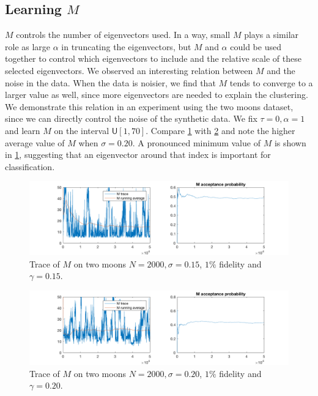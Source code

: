 \documentclass{siamart1116}
\begin{document}
    \subsection{Learning $M$}
        $M$ controls the number of eigenvectors used. In a way, small $M$ plays a similar role as large $\alpha$ in truncating the eigenvectors, but $M$ and $\alpha$ could be used together to control which eigenvectors to include and the relative scale of these selected eigenvectors. We observed an interesting relation between $M$ and the noise in the data. When the data is noisier, we find that $M$ tends to converge to a larger value as well, since more eigenvectors are needed to explain the clustering. We demonstrate this relation in an experiment using the two moons dataset, since we can directly control the noise of the synthetic data. We fix $\tau=0, \alpha = 1$ and learn $M$ on the interval $\mathsf{U}[1,70]$. Compare \cref{taM_M_moons_1} with \cref{taM_M_moons_2} and note the higher average value of $M$ when $\sigma=0.20$. A pronounced minimum value of $M$ is shown in \cref{taM_M_moons_1}, suggesting that an eigenvector around that index is important for classification.

        \begin{figure}[!htb]
        \centering
        \caption{\label{taM_M_moons_1}Trace of $M$ on two moons $N=2000, \sigma = 0.15$, $1\%$ fidelity and $\gamma = 0.15$.}
        \includegraphics[width=0.8\linewidth]{M_observations/sigma_15.png}
        \end{figure}

        \begin{figure}[!htb]
        \centering
        \caption{\label{taM_M_moons_2}Trace of $M$ on two moons $N=2000, \sigma = 0.20$, $1\%$ fidelity and $\gamma = 0.20$.}
        \includegraphics[width=0.8\linewidth]{M_observations/sigma_20.png}
        \end{figure}
\end{document}
